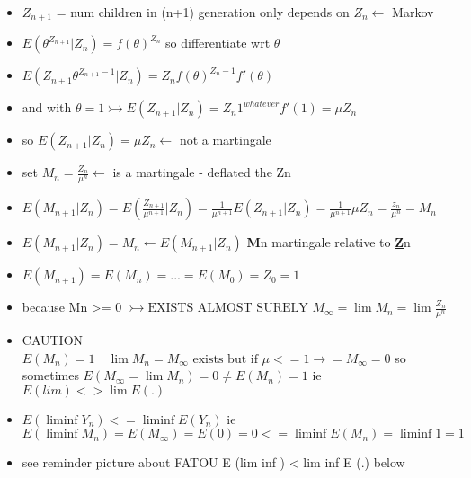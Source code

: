 \documentclass[10pt,landscape,a4paper]{article}
\newcommand{\myE}[1]{E \left( #1 \right) }
\newcommand{\mycondE}[2]{E \left( #1 | #2 \right) }
\begin{document}
\begin{multicols*}{3}
\begin{spacing}{0.5}
\begin{itemize}
\item $Z_{n+1}$ = num children in (n+1) generation only depends on $Z_{n} \leftarrow$ Markov \\
\item $E(\theta^{Z_{n+1}} | Z_n) = {f(\theta)}  ^ {Z_n} $ so differentiate wrt $\theta$\\
\item $E(Z_{n+1} \theta^{Z_{n+1}-1} | Z_n) = Z_n {f(\theta)}  ^ {Z_n-1} f'(\theta) $ \\
\item and with $\theta=1 \rightarrowtail E(Z_{n+1}|Z_n) = Z_n 1^{whatever} f'(1) = \mu Z_n $\\
\item so $E (Z_{n+1}|Z_n) = \mu Z_n \leftarrow $ not a martingale \\
\item set $M_n = \frac{Z_n}{\mu^{n}} \leftarrow $ is a martingale - deflated the Zn\\
\item $E( M_{n+1} |Z_n  )  =  E(  \frac{Z_{n+1}}{\mu^{n+1}} |Z_n  ) = \frac{1}{\mu^{n+1}} E(Z_{n+1}|Z_n) = \frac{1}{\mu^{n+1}} \mu Z_n= \frac{z_n}{\mu^{n}}= M_n $ \\
\item $E( M_{n+1} |Z_n  ) = M_n \leftarrow \mycondE{M_{n+1}}{Z_n} $ \textbf{M}n martingale relative to \underline{\textbf{Z}}n \\
\item $\myE{M_{n+1}} = \myE{M_n} = ... = \myE{M_0} = Z_0 = 1$ \\
\item {} because Mn >= 0 $ \rightarrowtail \text{EXISTS ALMOST SURELY } M_{\infty} = \lim M_n = \lim \frac{Z_n}{\mu^n}$ \\
\item CAUTION $  \myE{M_n}=1 \quad \lim M_n = M_{\infty} \text{ exists but if } \mu<=1  \rightarrow = M_{\infty}=0 $ so sometimes $\myE{M_{\infty} = \lim M_n}=0 \ne \myE{M_n} =1 $ ie $\myE{lim } <> \lim \myE{.} $\\

\item {} $\myE{\liminf Y_n} <= \liminf \myE{Y_n}$ ie $\myE{\liminf M_n}=\myE{M_{\infty}} = E(0) = 0 <= \liminf \myE{M_n} = \liminf 1 = 1$\\

\item  see reminder picture about FATOU  E (lim inf ) < lim inf E (.) below\\


\end{itemize}
\end{spacing}
\end{multicols*}
\end{document}
